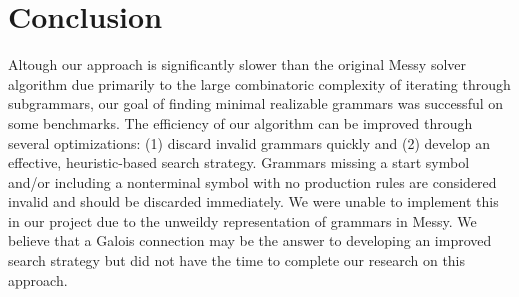 \documentclass[acmsmall, nonacm]{acmart}
\begin{document}
\section{Conclusion}
Altough our approach is significantly slower than the original Messy solver algorithm due primarily to the large combinatoric complexity of iterating through subgrammars, our goal of finding minimal realizable grammars was successful on some benchmarks. The efficiency of our algorithm can be improved through several optimizations: (1) discard invalid grammars quickly and (2) develop an effective, heuristic-based search strategy. Grammars missing a start symbol and/or including a nonterminal symbol with no production rules are considered invalid and should be discarded immediately. We were unable to implement this in our project due to the unweildy representation of grammars in Messy. We believe that a Galois connection may be the answer to developing an improved search strategy but did not have the time to complete our research on this approach.



\end{document}
